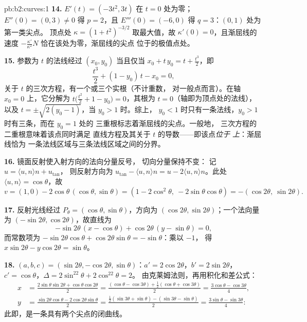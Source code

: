\begin{solution}{pb:b2:curves:1}
\textbf{14.} $E'(t) = (-3t^2, 3t)$ 在 $t = 0$ 处为零；
$E''(0) = (0, 3) \neq 0$ 得 $p = 2$，且 $E'''(0) = (-6,
0)$ 得 $q = 3$：$(0, 1)$ 处为第一类尖点。
顶点处 $\kappa = (1+t^2)^{-3/2}$ 取最大值，故
$\kappa'(0) = 0$，且渐屈线的速度
$-\frac{\kappa'}{\kappa^2}N$ 恰在该处为零，渐屈线的尖点
位于的极值点处。

\textbf{15.} 参数为 $t$ 的法线经过
$(x_0, y_0)$ 当且仅当 $x_0 + t\,y_0 = t + \tfrac{t^3}2$，即
\[
\frac{t^3}2 + (1 - y_0)\,t - x_0 = 0 ,
\]
关于 $t$ 的三次方程，有一个或三个实根（不计重数，
对一般点而言）。在轴 $x_0 = 0$ 上，它分解为
$t\bigl(\tfrac{t^2}2 + 1 - y_0\bigr) = 0$，其根为
$t = 0$（轴即为顶点处的法线），以及
$t = \pm\sqrt{2(y_0 - 1)}$，当 $y_0 > 1$ 时。综上，
$y_0 < 1$ 时只有一条法线，$y_0 > 1$ 时有三条，而在 $y_0 = 1$ 处的
三重根标志着渐屈线的尖点。一般地，
三次方程的二重根意味着该点同时满足
直线方程及其关于 $t$ 的导数——即该点\emph{位于
上}：渐屈线恰为
一条法线区域与三条法线区域之间的分界。

\textbf{16.} 镜面反射使入射方向的法向分量反号，
切向分量保持不变：
记 $u = \langle u, n\rangle n + u_{\mathrm{tan}}$，
则反射方向为 $u_{\mathrm{tan}} - \langle u,
n\rangle n = u - 2\langle u, n\rangle n$。此处 $\langle u,
n\rangle = \cos\theta$，故
\[
v = (1, 0) - 2\cos\theta\,(\cos\theta, \sin\theta)
= (1 - 2\cos^2\theta,\ -2\sin\theta\cos\theta)
= -(\cos2\theta,\ \sin2\theta).
\]

\textbf{17.} 反射光线经过 $P_\theta =
(\cos\theta, \sin\theta)$，方向为 $(\cos2\theta,
\sin2\theta)$；一个法向量为 $(-\sin2\theta,
\cos2\theta)$，故直线为
\[
-\sin2\theta\,(x - \cos\theta) + \cos2\theta\,(y -
\sin\theta) = 0,
\]
而常数项为 $-\sin2\theta\cos\theta +
\cos2\theta\sin\theta = -\sin\theta$：乘以 $-1$，
得 $x\sin2\theta - y\cos2\theta = \sin\theta$。

\textbf{18.} $(a, b, c) = (\sin2\theta, -\cos2\theta,
\sin\theta)$：$a' = 2\cos2\theta$，$b' = 2\sin2\theta$，$c' =
\cos\theta$，$\Delta = 2\sin^22\theta + 2\cos^22\theta = 2$。
由克莱姆法则，再用积化和差公式：
\begin{align*}
x &= \frac{2\sin\theta\sin2\theta +
\cos\theta\cos2\theta}{2}
= \frac{(\cos\theta - \cos3\theta) + \frac12(\cos\theta +
\cos3\theta)}{2} = \frac{3\cos\theta - \cos3\theta}4,\\
y &= \frac{\sin2\theta\cos\theta - 2\cos2\theta\sin\theta}2
= \frac{\frac12(\sin3\theta + \sin\theta) - (\sin3\theta -
\sin\theta)}2 = \frac{3\sin\theta - \sin3\theta}4 :
\end{align*}
此即，是一条具有两个尖点的闭曲线。


\end{solution}
